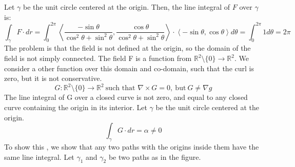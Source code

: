 \documentclass[a4paper]{article}
\begin{document}
Let $\gamma$ be the unit circle centered at the origin. Then, the line integral of $F$ over $\gamma$ is:
\[
    \int_{\gamma} F \cdot dr = \int_{0}^{2\pi} \left\langle \frac{-\sin \theta}{\cos^2 \theta + \sin^2 \theta}, \frac{\cos \theta}{\cos^2 \theta + \sin^2 \theta} \right\rangle \cdot \left\langle -\sin \theta, \cos \theta \right\rangle d\theta = \int_{0}^{2\pi} 1 d\theta = 2\pi
    \]
The problem is that the field is not defined at the origin, so the domain of the field is not simply connected. The field F is a function from $\mathbb{R}^2 \setminus \{0\} \rightarrow \mathbb{R}^2$. We consider a other function over this domain and co-domain, such that the curl is zero, but it is not conservative. \[
    G: \mathbb{R}^2 \setminus \{0\} \rightarrow \mathbb{R}^2\ \text{such that }  \nabla \times G = 0, \ \text{but} \ G \neq \nabla g
\]
The line integral of G over a closed curve is not zero, and equal to any closed curve containing the origin in its interior. Let  $\gamma$ be the unit circle centered at the origin.
\[
    \int_{\gamma} G \cdot dr = \alpha \neq 0
\]
To show this , we show that any two paths with the origins inside them have the same line integral. Let $\gamma_1$ and $\gamma_2$ be two paths as in the figure. 
\end{document}
